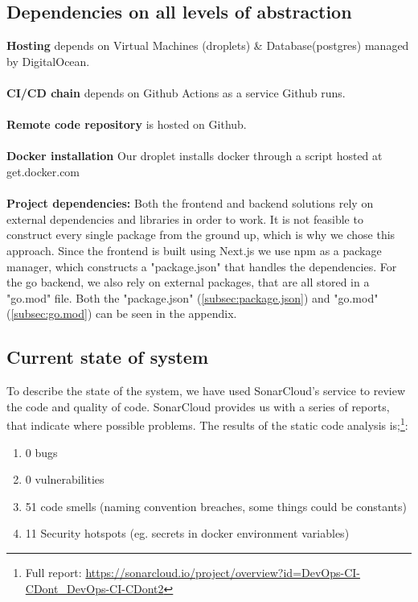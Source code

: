 \subsection{Dependencies on all levels of abstraction}
\textbf{Hosting} depends on Virtual Machines (droplets) \& Database(postgres) managed by DigitalOcean. 
\\\\
\textbf{CI/CD chain} depends on Github Actions as a service Github runs. 
\\\\
\textbf{Remote code repository} is hosted on Github.
\\\\
\textbf{Docker installation} Our droplet installs docker through a script hosted at get.docker.com
\\\\
\textbf{Project dependencies:} Both the frontend and backend solutions rely on external dependencies and libraries in order to work. It is not feasible to construct every single package from the ground up, which is why we chose this approach. Since the frontend is built using Next.js we use npm as a package manager, which constructs a "package.json" that handles the dependencies. For the go backend, we also rely on external packages, that are all stored in a "go.mod" file. Both the "package.json" (\ref{subsec:package.json}) and "go.mod" (\ref{subsec:go.mod}) can be seen in the appendix.

\subsection{Current state of system}
To describe the state of the system, we have used SonarCloud's \cite{sonarcloud} service to review the code and quality of code. SonarCloud provides us with a series of reports, that indicate where possible problems. The results of the static code analysis is;\footnote{Full report: \url{https://sonarcloud.io/project/overview?id=DevOps-CI-CDont_DevOps-CI-CDont2}}:
\begin{enumerate}
    \item 0 bugs
    \item 0 vulnerabilities
    \item 51 code smells (naming convention breaches, some things could be constants)
    \item 11 Security hotspots (eg. secrets in docker environment variables)
\end{enumerate}

